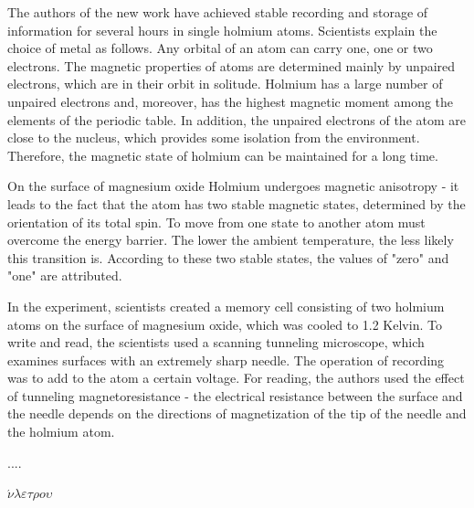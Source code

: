 \documentclass[a4paper,14pt]{extreport}
\begin{document}
  The authors of the new work have achieved stable recording and storage of information for several hours in single holmium atoms. Scientists explain the choice of metal as follows. Any orbital of an atom can carry one, one or two electrons. The magnetic properties of atoms are determined mainly by unpaired electrons, which are in their orbit in solitude. Holmium has a large number of unpaired electrons and, moreover, has the highest magnetic moment among the elements of the periodic table. In addition, the unpaired electrons of the atom are close to the nucleus, which provides some isolation from the environment. Therefore, the magnetic state of holmium can be maintained for a long time. \par

  On the surface of magnesium oxide Holmium undergoes magnetic anisotropy - it leads to the fact that the atom has two stable magnetic states, determined by the orientation of its total spin. To move from one state to another atom must overcome the energy barrier. The lower the ambient temperature, the less likely this transition is. According to these two stable states, the values of "zero" and "one" are attributed. \par

 In the experiment, scientists created a memory cell consisting of two holmium atoms on the surface of magnesium oxide, which was cooled to 1.2 Kelvin. To write and read, the scientists used a scanning tunneling microscope, which examines surfaces with an extremely sharp needle. The operation of recording was to add to the atom a certain voltage. For reading, the authors used the effect of tunneling magnetoresistance - the electrical resistance between the surface and the needle depends on the directions of magnetization of the tip of the needle and the holmium atom.

....



$\acute\nu \lambda\varepsilon\tau\rho o \upsilon$
\end{document}
